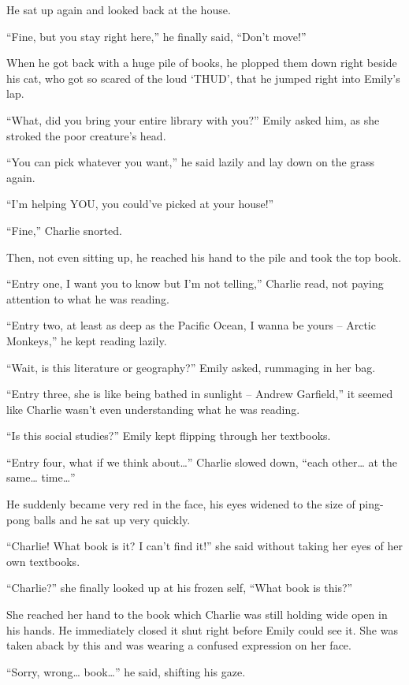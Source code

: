 He sat up again and looked back at the house.

“Fine, but you stay right here,” he finally said, “Don’t move!”

\bigskip

When he got back with a huge pile of books, he plopped them down right beside his cat, who got so scared of the loud ‘THUD’, that he jumped right into Emily’s lap.

“What, did you bring your entire library with you?” Emily asked him, as she stroked the poor creature’s head.

“You can pick whatever you want,” he said lazily and lay down on the grass again.

“I’m helping YOU, you could’ve picked at your house!”

“Fine,” Charlie snorted.

Then, not even sitting up, he reached his hand to the pile and took the top book.

“Entry one, I want you to know but I’m not telling,” Charlie read, not paying attention to what he was reading.

“Entry two, at least as deep as the Pacific Ocean, I wanna be yours – Arctic Monkeys,” he kept reading lazily.

“Wait, is this literature or geography?” Emily asked, rummaging in her bag.

“Entry three, she is like being bathed in sunlight – Andrew Garfield,” it seemed like Charlie wasn’t even understanding what he was reading.

“Is this social studies?” Emily kept flipping through her textbooks.

“Entry four, what if we think about…” Charlie slowed down, “each other… at the same… time…”

He suddenly became very red in the face, his eyes widened to the size of ping-pong balls and he sat up very quickly.

“Charlie! What book is it? I can’t find it!” she said without taking her eyes of her own textbooks.

“Charlie?” she finally looked up at his frozen self, “What book is this?”

She reached her hand to the book which Charlie was still holding wide open in his hands. He immediately closed it shut right before Emily could see it. She was taken aback by this and was wearing a confused expression on her face.

“Sorry, wrong… book…” he said, shifting his gaze.

